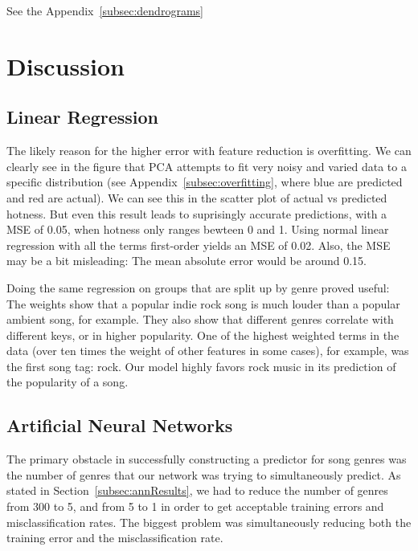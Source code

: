 \documentclass[12pt]{article}
\begin{document}
See the Appendix~\ref{subsec:dendrograms}

\section{Discussion}
\label{sec:discussion}

\subsection{Linear Regression}
\label{subsec:linearRegressionDisc}
The likely reason for the higher error with feature reduction is overfitting. We can clearly see in the figure that PCA attempts to fit very noisy and varied data to a specific distribution (see Appendix~\ref{subsec:overfitting}, where blue are predicted and red are actual). We can see this in the scatter plot of actual vs predicted hotness. But even this result leads to suprisingly accurate predictions, with a MSE of 0.05, when hotness only ranges bewteen 0 and 1. Using normal linear regression with all the terms first-order yields an MSE of 0.02.  Also, the MSE may be a bit misleading: The mean absolute error would be around 0.15. 

Doing the same regression on groups that are split up by genre proved useful: The weights show that a popular indie rock song is much louder than a popular ambient song, for example. They also show that different genres correlate with different keys, or in higher popularity. One of the highest weighted terms in the data (over ten times the weight of other features in some cases), for example, was the first song tag: rock. Our model highly favors rock music in its prediction of the popularity of a song.
\subsection{Artificial Neural Networks}
\label{subsec:annDisc}
The primary obstacle in successfully constructing a predictor for song genres was the number of genres that our network was trying to simultaneously predict. As stated in Section~\ref{subsec:annResults}, we had to reduce the number of genres from 300 to 5, and from 5 to 1 in order to get acceptable training errors and misclassification rates. The biggest problem was simultaneously reducing both the training error and the misclassification rate. 
\end{document}
